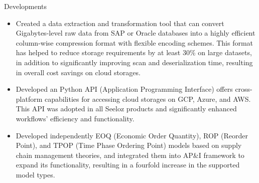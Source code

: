 \documentclass[margin, 10pt]{res} %
\begin{document}
\begin{resume}
\begin{itemize}
\end{itemize}
\textrm{Developments}
\begin{itemize}
    \item Created a data extraction and transformation tool that can convert Gigabytes-level raw data from SAP or Oracle databases into a highly efficient column-wise compression format with flexible encoding schemes. This format has helped to reduce storage requirements by at least 30\% on large datasets, in addition to significantly improving scan and deserialization time, resulting in overall cost savings on cloud storages.
    \item Developed an Python API (Application Programming Interface) offers cross-platform capabilities for accessing cloud storages on GCP, Azure, and AWS. This API was adopted in all Seeloz products and significantly enhanced workflows' efficiency and functionality.
    \item Developed independently EOQ (Economic Order Quantity), ROP (Reorder Point), and TPOP (Time Phase Ordering Point) models based on supply chain management theories, and integrated them into AP\&I framework to expand its functionality, resulting in a fourfold increase in the supported model types.

\end{itemize}
\end{resume}
\end{document}
